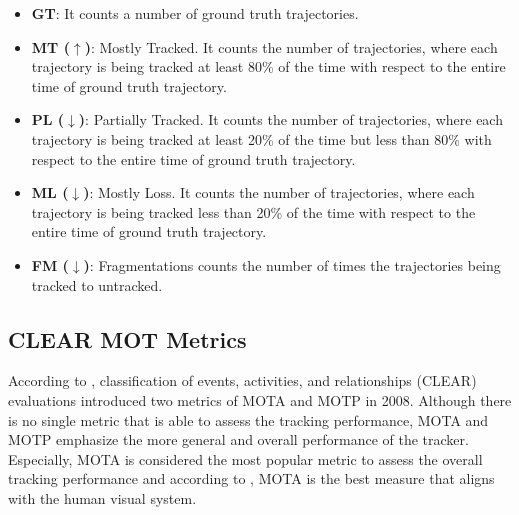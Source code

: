 \begin{itemize}

\item \textbf{GT}: It counts a number of ground truth trajectories.

\item \textbf{MT ($\uparrow$)}: Mostly Tracked. It counts the number of trajectories, where each trajectory is being tracked at least 80\% of the time with respect to the entire time of ground truth trajectory.

\item \textbf{PL ($\downarrow$)}: Partially Tracked. It counts the number of trajectories, where each trajectory is being tracked at least 20\% of the time but less than 80\% with respect to the entire time of ground truth trajectory.

\item \textbf{ML ($\downarrow$)}: Mostly Loss. It counts the number of trajectories, where each trajectory is being tracked less than 20\% of the time with respect to the entire time of ground truth trajectory.

\item \textbf{FM ($\downarrow$)}: Fragmentations counts the number of times the trajectories being tracked to untracked.
\end{itemize}



\subsection{CLEAR MOT Metrics}
According to \cite{bernardin_evaluating_2008}, classification of events, activities, and relationships (CLEAR) evaluations introduced two metrics of MOTA and MOTP in 2008.
Although there is no single metric that is able to assess the tracking performance, MOTA and MOTP emphasize the more general and overall performance of the tracker. Especially, MOTA is considered the most popular metric to assess the overall tracking performance \cite{milan_mot16_2016} and according to \cite{leal-taixe_tracking_2017}, MOTA is the best measure that aligns with the human visual system.

